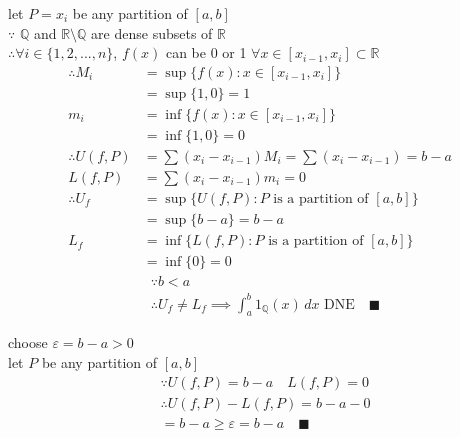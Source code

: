			\begin{example}
				let $P={x_i}$ be any partition of $[a,b]$\\
				$\because$ $\mathbb{Q}$ and $\mathbb{R}\setminus\mathbb{Q}$ are dense subsets of $\mathbb{R}$\\
				$\therefore\forall i\in\{1,2,...,n\}$, $f(x)$ can be 0 or 1 $\forall x\in[x_{i-1},x_i]\subset\mathbb{R}$
				\begin{align*}
					\therefore M_i&=\sup\{f(x):x\in[x_{i-1},x_i]\}\\
					   &=\sup\{1,0\}=1\\
					m_i&=\inf\{f(x):x\in[x_{i-1},x_i]\}\\
					   &=\inf\{1,0\}=0\\
					\therefore U(f,P)&=\sum(x_i-x_{i-1})M_i=\sum(x_i-x_{i-1})=b-a\\
					L(f,P)&=\sum(x_i-x_{i-1})m_i=0\\
					\therefore U_f&=\sup\{U(f,P):P\text{ is a partition of }[a,b]\}\\
						  &=\sup\{b-a\}=b-a\\
					L_f&=\inf\{L(f,P):P\text{ is a partition of }[a,b]\}\\
					   &=\inf\{0\}=0
			   \end{align*}
			   \begin{align*}
					&\because b<a\\
					&\therefore U_f\ne L_f\implies\int_a^b1_{\mathbb{Q}}(x)\,dx\text{ DNE}\quad\blacksquare
				\end{align*}
			\end{example}
			\begin{example}
				choose $\varepsilon=b-a>0$\\
				let $P$ be any partition of $[a,b]$
				\begin{align*}
					&\because U(f,P)=b-a\quad L(f,P)=0\tag*{(from previous)}\\
					&\therefore U(f,P)-L(f,P)=b-a-0\\
					&=b-a\ge\varepsilon=b-a\quad\blacksquare
				\end{align*} 
			\end{example}

